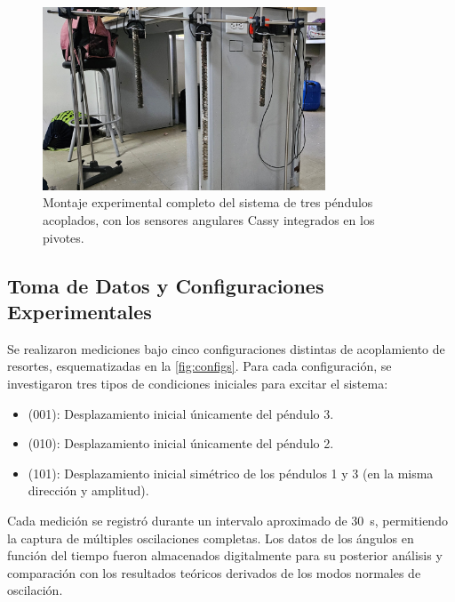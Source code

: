 \begin{figure}[htbp!]
  \centering
  \includegraphics[width=0.75\textwidth]{Figures/set-up.jpeg}
  \caption{Montaje experimental completo del sistema de tres
    p\'endulos acoplados, con los sensores angulares Cassy
  integrados en los pivotes.}
  \label{fig:montaje}
\end{figure}

\subsection{Toma de Datos y Configuraciones Experimentales}

Se realizaron mediciones bajo cinco configuraciones distintas de
acoplamiento de resortes, esquematizadas en la \cref{fig:configs}.
Para cada configuraci\'on, se investigaron tres tipos de
condiciones iniciales para excitar el sistema:
\begin{itemize}
  \item (001): Desplazamiento inicial \'unicamente del p\'endulo 3.
  \item (010): Desplazamiento inicial \'unicamente del p\'endulo 2.
  \item (101): Desplazamiento inicial sim\'etrico de los p\'endulos
    1 y 3 (en la misma direcci\'on y amplitud).
\end{itemize}
Cada medici\'on se registr\'o durante un intervalo aproximado de
\qty{30}{\second}, permitiendo la captura de m\'ultiples
oscilaciones completas. Los datos de los \'angulos en funci\'on
del tiempo fueron almacenados digitalmente para su posterior
an\'alisis y comparaci\'on con los resultados te\'oricos derivados
de los modos normales de oscilaci\'on.

